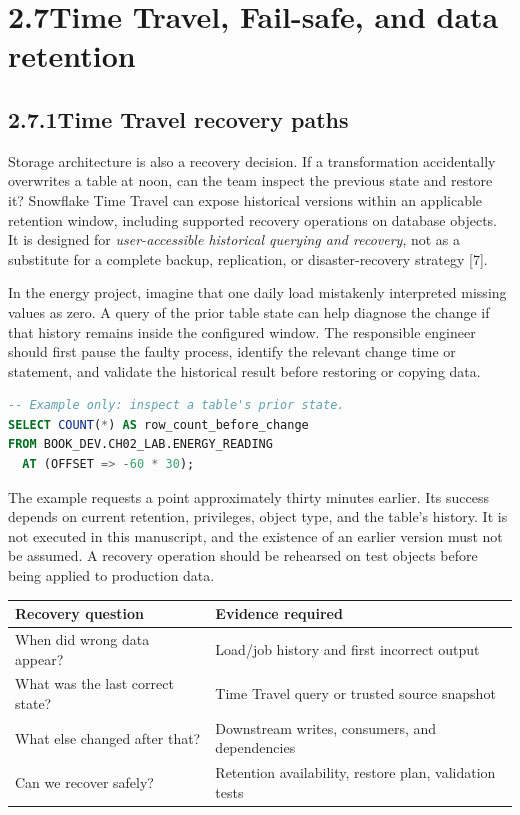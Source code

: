 \documentclass[11pt,twoside]{article}
\newcommand{\topic}[2]{\subsection*{#1\quad #2}}
\begin{document}
\newpage
\section*{2.7\quad Time Travel, Fail-safe, and data retention}
\topic{2.7.1}{Time Travel recovery paths}
Storage architecture is also a recovery decision. If a transformation accidentally overwrites a table at noon, can the team inspect the previous state and restore it? Snowflake Time Travel can expose historical versions within an applicable retention window, including supported recovery operations on database objects. It is designed for \emph{user-accessible historical querying and recovery}, not as a substitute for a complete backup, replication, or disaster-recovery strategy [7].

In the energy project, imagine that one daily load mistakenly interpreted missing values as zero. A query of the prior table state can help diagnose the change if that history remains inside the configured window. The responsible engineer should first pause the faulty process, identify the relevant change time or statement, and validate the historical result before restoring or copying data.

\begin{lstlisting}[language=SQL,caption={A read-only historical query; an eligible table and retention window are required.}]
-- Example only: inspect a table's prior state.
SELECT COUNT(*) AS row_count_before_change
FROM BOOK_DEV.CH02_LAB.ENERGY_READING
  AT (OFFSET => -60 * 30);
\end{lstlisting}

The example requests a point approximately thirty minutes earlier. Its success depends on current retention, privileges, object type, and the table's history. It is not executed in this manuscript, and the existence of an earlier version must not be assumed. A recovery operation should be rehearsed on test objects before being applied to production data.

\begin{center}\small
\begin{tabularx}{\linewidth}{@{}p{38mm}X@{}}\toprule
\textbf{Recovery question} & \textbf{Evidence required}\\\midrule
When did wrong data appear? & Load/job history and first incorrect output\\
What was the last correct state? & Time Travel query or trusted source snapshot\\
What else changed after that? & Downstream writes, consumers, and dependencies\\
Can we recover safely? & Retention availability, restore plan, validation tests\\
\bottomrule\end{tabularx}\end{center}
\end{document}
